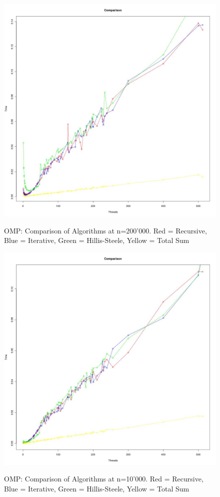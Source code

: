 \documentclass[12pt]{article}
\begin{document}
\begin{figure}[H]
\centering
\caption{OMP: Comparison of Algorithms at n=200'000. Red = Recursive, Blue = Iterative, 
Green = Hillis-Steele, Yellow = Total Sum}

\includegraphics[scale=0.4]{candidate-graphs/omp_p1_compare_200000.jpg}
\label{omp_p1_200000}
\end{figure}

\begin{figure}[H]
\centering
\caption{OMP: Comparison of Algorithms at n=10'000. Red = Recursive, Blue = Iterative, 
Green = Hillis-Steele, Yellow = Total Sum}

\includegraphics[scale=0.4]{candidate-graphs/omp_p1_compare_10000.jpg}
\label{omp_p1_10000}
\end{figure}
\end{document}
